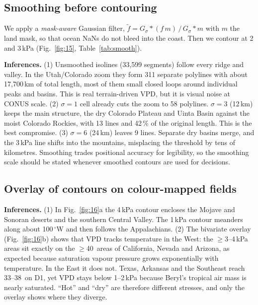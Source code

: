 \subsection{Smoothing before contouring}
We apply a \emph{mask-aware} Gaussian filter, $\tilde f=G_\sigma*(f\,m)\,/\,G_\sigma*m$ with $m$ the land mask, so that ocean
NaNs do not bleed into the coast. Then we contour at 2 and 3\,kPa (Fig.~\ref{fig:15}, Table~\ref{tab:smooth}).



\textbf{Inferences.}
(1) Unsmoothed isolines (33,599 segments) follow every ridge and valley. In the Utah/Colorado zoom they form 311 separate
polylines with about 17,700\,km of total length, most of them small closed loops around individual peaks and basins.
This is real terrain-driven VPD, but it is visual noise at CONUS scale.
(2) $\sigma=1$ cell already cuts the zoom to 58 polylines. $\sigma=3$ (12\,km) keeps the main structure, the dry Colorado
Plateau and Uinta Basin against the moist Colorado Rockies, with 13 lines and 42\,\% of the original length. This is the
best compromise.
(3) $\sigma=6$ (24\,km) leaves 9 lines. Separate dry basins merge, and the 3\,kPa line shifts into the mountains,
misplacing the threshold by tens of kilometres. Smoothing trades positional accuracy for legibility, so the smoothing
scale should be stated whenever smoothed contours are used for decisions.

\subsection{Overlay of contours on colour-mapped fields}

\textbf{Inferences.}
(1) In Fig.~\ref{fig:16}a the 4\,kPa contour encloses the Mojave and Sonoran deserts and the southern Central Valley. The
1\,kPa contour meanders along about 100\,$^\circ$W and then follows the Appalachians.
(2) The bivariate overlay (Fig.~\ref{fig:16}b) shows that VPD tracks temperature in the West: the $\ge$3--4\,kPa areas sit
exactly on the $\ge$40\,\degC{} areas of California, Nevada and Arizona, as expected because saturation vapour pressure grows
exponentially with temperature. In the East it does not. Texas, Arkansas and the Southeast reach 33--38\,\degC{} on D1, yet
VPD stays below 1--2\,kPa because Beryl's tropical air mass is nearly saturated. ``Hot'' and ``dry'' are therefore
different stresses, and only the overlay shows where they diverge.


